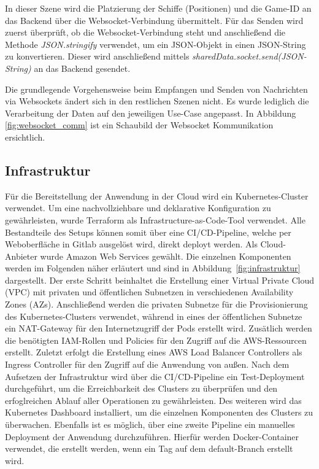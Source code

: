 \documentclass[a4paper, 10pt, conference]{IEEEtran}
\begin{document}
In dieser Szene wird die Platzierung der Schiffe (Positionen) und die Game-ID an das Backend über die Websocket-Verbindung übermittelt. Für das Senden wird zuerst überprüft, ob die Websocket-Verbindung steht und anschließend die Methode \textit{JSON.stringify} verwendet, um ein JSON-Objekt in einen JSON-String zu konvertieren. Dieser wird anschließend mittels \textit{sharedData.socket.send(JSON-String)} an das Backend gesendet.

 Die grundlegende Vorgehensweise beim Empfangen und Senden von Nachrichten via Websockets ändert sich in den restlichen Szenen nicht. Es wurde lediglich die Verarbeitung der Daten auf den jeweiligen Use-Case angepasst. In Abbildung \ref{fig:websocket_comm} ist ein Schaubild der Websocket Kommunikation ersichtlich.





\subsection{Infrastruktur}\label{subsec:infrastruktur}

Für die Bereitstellung der Anwendung in der Cloud wird ein Kubernetes-Cluster\cite{kubernetes} verwendet. 
Um eine nachvollziehbare und deklarative Konfiguration zu gewährleisten, wurde Terraform\cite{terraform} als Infrastructure-as-Code-Tool verwendet. 
Alle Bestandteile des Setups können somit über eine CI/CD-Pipeline, welche per Weboberfläche in Gitlab ausgelöst wird, direkt deployt werden.
Als Cloud-Anbieter wurde Amazon Web Services gewählt. Die einzelnen Komponenten werden im Folgenden näher erläutert und sind in Abbildung~\ref{fig:infrastruktur} dargestellt.
Der erste Schritt beinhaltet die Erstellung einer Virtual Private Cloud (VPC) mit privaten und öffentlichen Subnetzen in verschiedenen Availability Zones (AZs).
Anschließend werden die privaten Subnetze für die Provisionierung des Kubernetes-Clusters verwendet, während in eines der öffentlichen Subnetze ein NAT-Gateway für den Internetzugriff der Pods erstellt wird.
Zusätlich werden die benötigten IAM-Rollen und Policies für den Zugriff auf die AWS-Ressourcen erstellt.
Zuletzt erfolgt die Erstellung eines AWS Load Balancer Controllers als Ingress Controller für den Zugriff auf die Anwendung von außen.
Nach dem Aufsetzen der Infrastruktur wird über die CI/CD-Pipeline ein Test-Deployment durchgeführt, um die Erreichbarkeit des Clusters zu überprüfen und den erfoglreichen Ablauf aller Operationen zu gewährleisten.
Des weiteren wird das Kubernetes Dashboard installiert, um die einzelnen Komponenten des Clusters zu überwachen.
Ebenfalls ist es möglich, über eine zweite Pipeline ein manuelles Deployment der Anwendung durchzuführen.
Hierfür werden Docker-Container verwendet, die erstellt werden, wenn ein Tag auf dem default-Branch erstellt wird.
\end{document}
